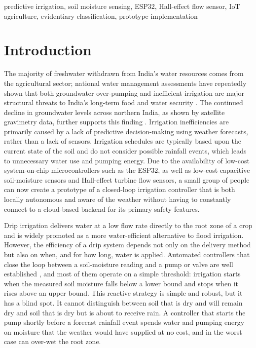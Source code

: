 \documentclass[conference]{IEEEtran}
\begin{document}
\begin{IEEEkeywords}
predictive irrigation, soil moisture sensing, ESP32, Hall-effect flow sensor, IoT agriculture, evidentiary classification, prototype implementation
\end{IEEEkeywords}

\section{Introduction}

The majority of freshwater withdrawn from India's water resources comes from
the agricultural sector; national water management assessments have repeatedly
shown that both groundwater over-pumping and inefficient irrigation are major
structural threats to India's long-term food and water security
\cite{niti2019cwmi,fao2024aquastat}. The continued decline in groundwater
levels across northern India, as shown by satellite gravimetry data, further
supports this finding \cite{rodell2009groundwater}. Irrigation inefficiencies
are primarily caused by a lack of predictive decision-making using weather
forecasts, rather than a lack of sensors. Irrigation schedules are typically
based upon the current state of the soil and do not consider possible rainfall
events, which leads to unnecessary water use and pumping energy. Due to the
availability of low-cost system-on-chip microcontrollers such as the ESP32, as
well as low-cost capacitive soil-moisture sensors and Hall-effect turbine flow
sensors, a small group of people can now create a prototype of a closed-loop
irrigation controller that is both locally autonomous and aware of the weather
without having to constantly connect to a cloud-based backend for its primary
safety features.

Drip irrigation delivers water at a low flow rate directly to the root zone of
a crop and is widely promoted as a more water-efficient alternative to flood
irrigation. However, the efficiency of a drip system depends not only on the
delivery method but also on when, and for how long, water is applied.
Automated controllers that close the loop between a soil-moisture reading and
a pump or valve are well established
\cite{gutierrez2014automated,vaishali2017mobile,garcia2020iot}, and most of
them operate on a simple threshold: irrigation starts when the measured soil
moisture falls below a lower bound and stops when it rises above an upper
bound. This reactive strategy is simple and robust, but it has a blind spot.
It cannot distinguish between soil that is dry and will remain dry and soil
that is dry but is about to receive rain. A controller that starts the pump
shortly before a forecast rainfall event spends water and pumping energy on
moisture that the weather would have supplied at no cost, and in the worst
case can over-wet the root zone.
\end{document}
